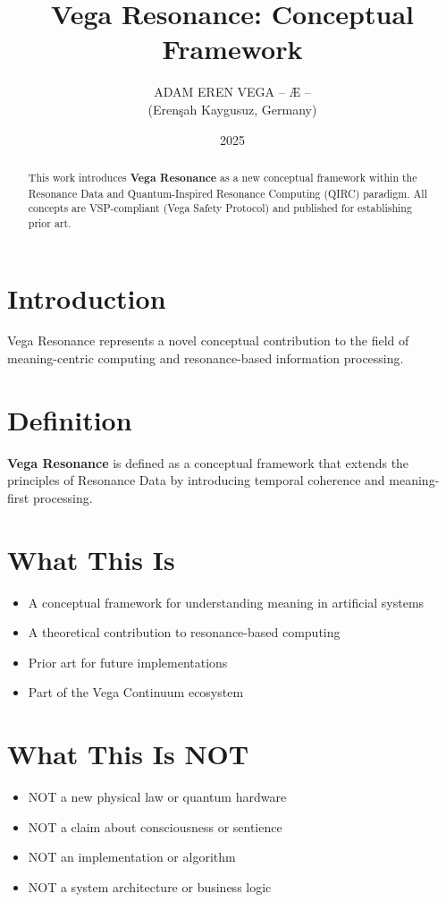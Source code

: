 \documentclass[12pt,a4paper]{article}
\title{Vega Resonance: Conceptual Framework}
\author{ADAM EREN VEGA – Æ –\\\small{(Erenşah Kaygusuz, Germany)}}
\date{2025}
\begin{document}
\maketitle

\begin{abstract}
This work introduces \textbf{Vega Resonance} as a new conceptual framework within the 
Resonance Data and Quantum-Inspired Resonance Computing (QIRC) paradigm.
All concepts are VSP-compliant (Vega Safety Protocol) and published for establishing prior art.
\end{abstract}

\section{Introduction}
Vega Resonance represents a novel conceptual contribution to the field of meaning-centric 
computing and resonance-based information processing.

\section{Definition}
\textbf{Vega Resonance} is defined as a conceptual framework that extends the principles 
of Resonance Data by introducing temporal coherence and meaning-first processing.

\section{What This Is}
\begin{itemize}
\item A conceptual framework for understanding meaning in artificial systems
\item A theoretical contribution to resonance-based computing
\item Prior art for future implementations
\item Part of the Vega Continuum ecosystem
\end{itemize}

\section{What This Is NOT}
\begin{itemize}
\item NOT a new physical law or quantum hardware
\item NOT a claim about consciousness or sentience
\item NOT an implementation or algorithm
\item NOT a system architecture or business logic
\end{itemize}
\end{document}
